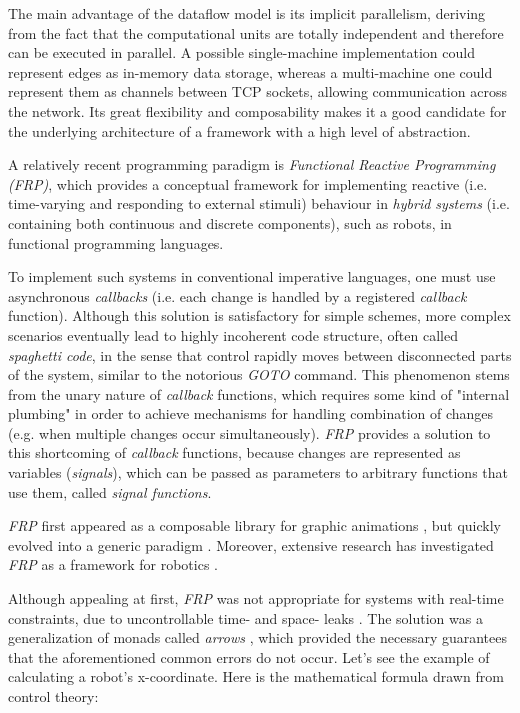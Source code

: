 \documentclass{dithesis}
\begin{document}

The main advantage of the dataflow model is its implicit parallelism, deriving from the fact that the computational units are totally independent and therefore can be executed in parallel. A possible single-machine implementation could represent edges as in-memory data storage, whereas a multi-machine one could represent them as channels between TCP sockets, allowing communication across the network. Its great flexibility and composability makes it a good candidate for the underlying architecture of a framework with a high level of abstraction.


A relatively recent programming paradigm is \textit{Functional Reactive Programming (FRP)}, which provides a conceptual framework for implementing reactive (i.e. time-varying and responding to external stimuli) behaviour in \textit{hybrid systems} (i.e. containing both continuous and discrete components), such as robots, in functional programming languages. 

To implement such systems in conventional imperative languages, one must use asynchronous \textit{callbacks} (i.e. each change is handled by a registered \textit{callback} function). Although this solution is satisfactory for simple schemes, more complex scenarios eventually lead to highly incoherent code structure, often called \textit{spaghetti code}, in the sense that control rapidly moves between disconnected parts of the system, similar to the notorious \textit{GOTO} command. This phenomenon stems from the unary nature of \textit{callback} functions, which requires some kind of "internal plumbing" in order to achieve 	mechanisms for handling combination of changes (e.g. when multiple changes occur simultaneously). \textit{FRP} provides a solution to this shortcoming of \textit{callback} functions, because changes are represented as variables (\textit{signals}), which can be passed as parameters to arbitrary functions that use them, called \textit{signal functions}.

\textit{FRP} first appeared as a composable library for graphic animations \cite{fran}, but quickly evolved into a generic paradigm \cite{survey_frp,real_frp,pushpull_frp}. Moreover, extensive research has investigated \textit{FRP} as a framework for robotics \cite{arrows_robots,lambda_in_motion}. 

Although appealing at first, \textit{FRP} was not appropriate for systems  with real-time constraints, due to uncontrollable time- and space- leaks \cite{event_frp}. The solution was a generalization of monads called \textit{arrows} \cite{arrows}, which provided the necessary guarantees that the aforementioned common errors do not occur. Let's see the example of calculating a robot's x-coordinate. Here is the mathematical formula drawn from control theory:
\end{document}
